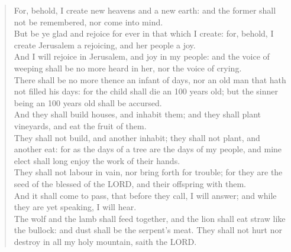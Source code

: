 \documentclass[MAIN]{subfiles}
\begin{document}
\begin{verse}
For, behold, I create new heavens and a new earth: and the former shall not be remembered, nor come into mind.\\
But be ye glad and rejoice for ever in that which I create: for, behold, I create {\sc Jerusalem} a rejoicing, and her people a joy.\\
And I will rejoice in {\sc Jerusalem}, and joy in my people: and the voice of weeping shall be no more heard in her, nor the voice of crying.\\
There shall be no more thence an infant of days, nor an old man that hath not filled his days: for the child shall die an 100 years old; but the sinner being an 100 years old shall be accursed.\\
And they shall build houses, and inhabit them; and they shall plant vineyards, and eat the fruit of them.\\
They shall not build, and another inhabit; they shall not plant, and another eat: for as the days of a tree are the days of my people, and mine elect shall long enjoy the work of their hands.\\
They shall not labour in vain, nor bring forth for trouble; for they are the seed of the blessed of the {\hge LORD}, and their offspring with them.\\
And it shall come to pass, that before they call, I will answer; and while they are yet speaking, I will hear.\\
The wolf and the lamb shall feed together, and the lion shall eat straw like the bullock: and dust shall be the serpent's meat. They shall not hurt nor destroy in all my holy mountain, saith the {\hge LORD}.
\end{verse}
\end{document}
